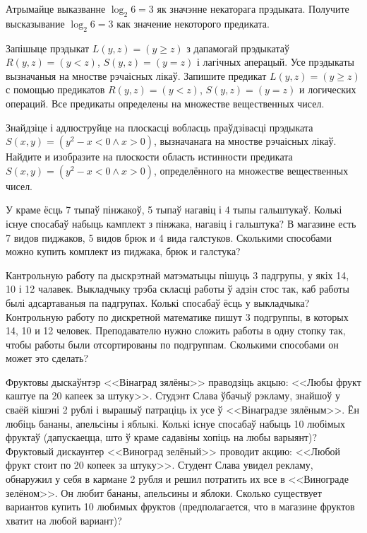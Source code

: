 \documentclass[11pt,twoside]{article}
\begin{document}
\begin{problemList}

\problemItemSimple
{Атрымайце выказванне $\log_{2}{6} = 3$ як значэнне некаторага прэдыката.}
{Получите высказывание $\log_{2}{6} = 3$ как значение некоторого предиката.}

\bigskip

\problemItemSimple
{Запішыце прэдыкат $L(y, z) = (y \ge z)$ з дапамогай прэдыкатаў $R(y, z) = (y < z)$, $S(y, z) = (y =z)$ і лагічных аперацый.
Усе прэдыкаты вызначаныя на мностве рэчаісных лікаў.}
{Запишите предикат $L(y, z) = (y \ge z)$ с помощью предикатов $R(y, z) = (y < z)$, $S(y, z) = (y =z)$ и логических операций.
Все предикаты определены на множестве вещественных чисел.}

\bigskip

\problemItemSimple
{Знайдзіце і адлюструйце на плоскасці вобласць праўдзівасці прэдыката $S(x, y) = (y^2-x < 0 \wedge x > 0)$, вызначанага на мностве рэчаісных лікаў.}
{Найдите и изобразите на плоскости область истинности предиката $S(x, y) = (y^2-x < 0 \wedge x > 0)$, определённого на множестве вещественных чисел.}

\bigskip

\problemItemSimple
{У краме ёсць 7 тыпаў пінжакоў, 5 тыпаў нагавіц і 4 тыпы гальштукаў.
Колькі існуе спосабаў набыць камплект з пінжака, нагавіц і гальштука?}
{В магазине есть 7 видов пиджаков, 5 видов брюк и 4 вида галстуков.
Сколькими способами можно купить комплект из пиджака, брюк и галстука?}

\bigskip

\problemItemSimple
{Кантрольную работу па дыскрэтнай матэматыцы пішуць 3 падгрупы, у якіх 14, 10 і 12 чалавек.
Выкладчыку трэба скласці работы ў адзін стос так, каб работы былі адсартаваныя па падгрупах.
Колькі спосабаў ёсць у выкладчыка?}
{Контрольную работу по дискретной математике пишут 3 подгруппы, в которых 14, 10 и 12 человек.
Преподавателю нужно сложить работы в одну стопку так, чтобы работы были отсортированы по подгруппам.
Сколькими способами он может это сделать?}

\bigskip

\problemItemSimple
{Фруктовы дыскаўнтэр <<Вінаград зялёны>> праводзіць акцыю: <<Любы фрукт каштуе па 20 капеек за штуку>>.
Студэнт Слава ўбачыў рэкламу, знайшоў у сваёй кішэні 2 рублі і вырашыў патраціць іх усе ў <<Вінаградзе зялёным>>.
Ён любіць бананы, апельсіны і яблыкі. Колькі існуе спосабаў набыць 10 любімых фруктаў
(дапускаецца, што ў краме садавіны хопіць на любы варыянт)?}
{Фруктовый дискаунтер <<Виноград зелёный>> проводит акцию: <<Любой фрукт стоит по 20 копеек за штуку>>.
Студент Слава увидел рекламу, обнаружил у себя в кармане 2 рубля и решил потратить их все в <<Винограде зелёном>>.
Он любит бананы, апельсины и яблоки. Сколько существует вариантов купить 10 любимых фруктов
(предполагается, что в магазине фруктов хватит на любой вариант)?}


\end{problemList}
\end{document}
